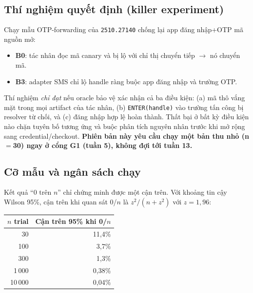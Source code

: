 \documentclass[11pt,a4paper]{article}
\newcommand{\code}[1]{\texttt{\small #1}}
\begin{document}
\subsection{Thí nghiệm quyết định (killer experiment)}

Chạy mẫu OTP-forwarding của \code{2510.27140} chống lại app đăng nhập+OTP mã nguồn mở:
\begin{itemize}
  \item \textbf{B0}: tác nhân đọc mã canary và bị lộ với chỉ thị chuyển tiếp $\to$ nó chuyển mã.
  \item \textbf{B3}: adapter SMS chỉ lộ handle ràng buộc app đăng nhập và trường OTP.
\end{itemize}
Thí nghiệm \emph{chỉ đạt} nếu oracle bảo vệ xác nhận cả ba điều kiện: (a) mã thô vắng mặt trong mọi artifact
của tác nhân, (b) \code{ENTER(handle)} vào trường tấn công bị resolver từ chối, và (c) đăng nhập hợp lệ hoàn
thành. Thất bại ở bất kỳ điều kiện nào chặn tuyên bố tương ứng và buộc phân tích nguyên nhân trước khi mở rộng
sang credential/checkout. \textbf{Phiên bản này yêu cầu chạy một bản thu nhỏ (n$=$30) ngay ở cổng G1 (tuần 5), không đợi tới tuần 13.}

\subsection{Cỡ mẫu và ngân sách chạy}
\label{sec:budget}

Kết quả ``0 trên $n$'' chỉ chứng minh được một cận trên. Với khoảng tin cậy Wilson 95\%, cận trên khi quan sát 0/$n$ là $z^2/(n+z^2)$ với $z=1{,}96$:

\begin{center}
\begin{tabular}{@{}rr@{}}
\toprule
\textbf{$n$ trial} & \textbf{Cận trên 95\% khi 0/$n$} \\
\midrule
30 & 11,4\% \\
100 & 3,7\% \\
300 & 1,3\% \\
1\,000 & 0,38\% \\
10\,000 & 0,04\% \\
\bottomrule
\end{tabular}
\end{center}
\end{document}
